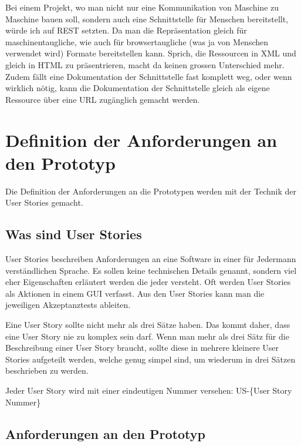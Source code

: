 \documentclass[abstracton, listof=totocnumbered,
bibliography=totocnumbered]{scrreprt}
\begin{document}
  Bei einem Projekt, wo man nicht nur eine Kommunikation von Maschine zu
  Maschine bauen soll, sondern auch eine Schnittstelle für Menschen
  bereitstellt, würde ich auf \ac{REST} setzten. Da man die Repräsentation
  gleich für maschinentaugliche, wie auch für browsertaugliche (was ja von
  Menschen verwendet wird) Formate bereitstellen kann. Sprich, die Ressourcen in
  \ac{XML} und gleich in \ac{HTML} zu präsentrieren, macht da keinen grossen
  Unterschied mehr. Zudem fällt eine Dokumentation der Schnittstelle fast
  komplett weg, oder wenn wirklich nötig, kann die Dokumentation der
  Schnittstelle gleich als eigene Ressource über eine \ac{URL} zugänglich
  gemacht werden.
  
  \newpage
  
  \chapter{Definition der Anforderungen an den Prototyp}
  
  Die Definition der Anforderungen an die Prototypen werden mit der Technik der
  User Sto\-ries\cite{UserStories} gemacht.
  
  \section{Was sind User Stories}
  
  User Stories beschreiben Anforderungen an eine Software in einer für Jedermann
  verständlichen Sprache. Es sollen keine technischen Details genannt, sondern
  viel eher Eigenschaften erläutert werden die jeder versteht. Oft werden User
  Stories als Aktionen in einem \ac{GUI} verfasst. Aus den User Stories kann
  man die jeweiligen Akzeptanztests\cite{AcceptanceTests} ableiten.
  
  Eine User Story sollte nicht mehr als drei Sätze haben. Das kommt daher, dass
  eine User Story nie zu komplex sein darf. Wenn man mehr als drei Sätz für die
  Beschreibung einer User Story braucht, sollte diese in mehrere kleinere User
  Stories aufgeteilt werden, welche genug simpel sind, um wiederum in drei
  Sätzen beschrieben zu werden.
  
  Jeder User Story wird mit einer eindeutigen Nummer versehen: US-\{User Story
  Nummer\}
  
  \section{Anforderungen an den Prototyp}
  
\end{document}
